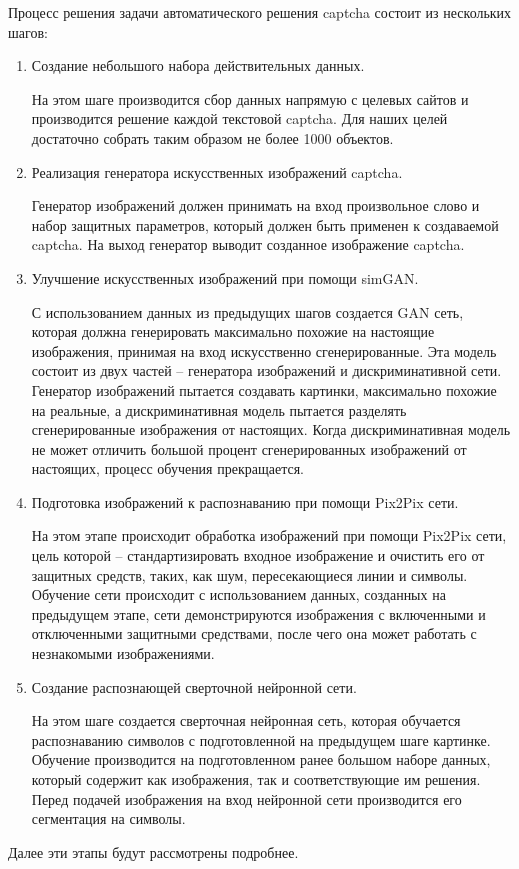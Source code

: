 Процесс решения задачи автоматического решения captcha состоит из нескольких шагов:
\begin{enumerate}[1)]
	\item Создание небольшого набора действительных данных.
	
	На этом шаге производится сбор данных напрямую с целевых сайтов и производится решение каждой текстовой captcha. Для наших целей достаточно собрать таким образом не более 1000 объектов.
	\item Реализация генератора искусственных изображений captcha.
	
	Генератор изображений должен принимать на вход произвольное слово и набор защитных параметров, который должен быть применен к создаваемой captcha. На выход генератор выводит созданное изображение captcha.
	\item Улучшение искусственных изображений при помощи simGAN.
	
	С использованием данных из предыдущих шагов создается GAN сеть, которая должна генерировать максимально похожие на настоящие изображения, принимая на вход искусственно сгенерированные. Эта модель состоит из двух частей – генератора изображений и дискриминативной сети. Генератор изображений пытается создавать картинки, максимально похожие на реальные, а дискриминативная модель пытается разделять сгенерированные изображения от настоящих. Когда дискриминативная модель не может отличить большой процент сгенерированных изображений от настоящих, процесс обучения прекращается.
	\item Подготовка изображений к распознаванию при помощи Pix2Pix сети.
	
	На этом этапе происходит обработка изображений при помощи Pix2Pix сети, цель которой – стандартизировать входное изображение и очистить его от защитных средств, таких, как шум, пересекающиеся линии и символы. Обучение сети происходит с использованием данных, созданных на предыдущем этапе, сети демонстрируются изображения с включенными и отключенными защитными средствами, после чего она может работать с незнакомыми изображениями.
	\item Создание распознающей сверточной нейронной сети.
	
	На этом шаге создается сверточная нейронная сеть, которая обучается распознаванию символов с подготовленной на предыдущем шаге картинке. Обучение производится на подготовленном ранее большом наборе данных, который содержит как изображения, так и соответствующие им решения. Перед подачей изображения на вход нейронной сети производится его сегментация на символы.
\end{enumerate}

Далее эти этапы будут рассмотрены подробнее.